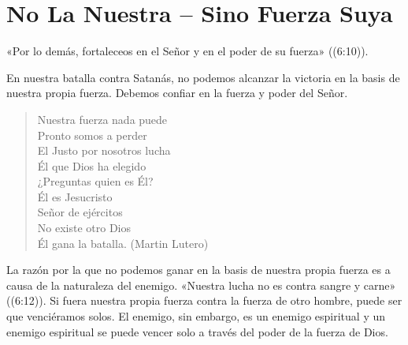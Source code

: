 \documentclass[12pt, twoside, openright]{book}
\begin{document}
\section{No La Nuestra – Sino Fuerza Suya}
«Por lo demás, fortaleceos en el Señor y en el poder de su fuerza» ((6:10)).

En nuestra batalla contra Satanás, no podemos alcanzar la victoria en la basis de nuestra propia fuerza. Debemos confiar en la fuerza y poder del Señor.
\begin{flushleft}
\begin{verse}
Nuestra fuerza nada puede\\
Pronto somos a perder\\
El Justo por nosotros lucha\\
Él que Dios ha elegido\\
¿Preguntas quien es Él?\\
Él es Jesucristo\\
Señor de ejércitos\\
No existe otro Dios\\
Él gana la batalla. (Martin Lutero)
\end{verse}
\end{flushleft}

La razón por la que no podemos ganar en la basis de nuestra propia fuerza es a causa de la naturaleza del enemigo. «Nuestra lucha no es contra sangre y carne» ((6:12)). Si fuera nuestra propia fuerza contra la fuerza de otro hombre, puede ser que venciéramos solos. El enemigo, sin embargo, es un enemigo espiritual y un enemigo espiritual se puede vencer solo a través del poder de la fuerza de Dios. 
\end{document}
